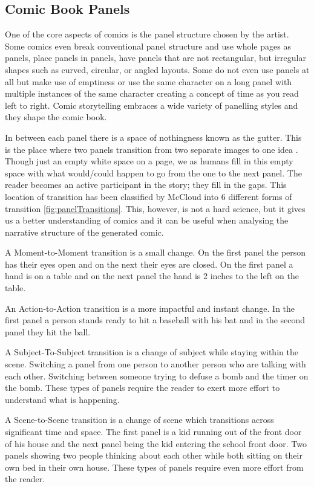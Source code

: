 \subsection*{Comic Book Panels}
One of the core aspects of comics is the panel structure chosen by the artist. Some comics even break conventional panel structure and use whole pages as panels, place panels in panels, have panels that are not rectangular, but irregular shapes such as curved, circular, or angled layouts. Some do not even use panels at all but make use of emptiness or use the same character on a long panel with multiple instances of the same character creating a concept of time as you read left to right. Comic storytelling embraces a wide variety of panelling styles and they shape the comic book.

In between each panel there is a space of nothingness known as the gutter. This is the place where two panels transition from two separate images to one idea \cite{mccloud1993understanding}. Though just an empty white space on a page, we as humans fill in this empty space with what would/could happen to go from the one to the next panel. The reader becomes an active participant in the story; they fill in the gaps. This location of transition has been classified by McCloud into 6 different forms of transition \ref{fig:panelTransitions}. This, however, is not a hard science, but it gives us a better understanding of comics and it can be useful when analysing the narrative structure of the generated comic.

A Moment-to-Moment transition is a small change. On the first panel the person has their eyes open and on the next their eyes are closed. On the first panel a hand is on a table and on the next panel the hand is 2 inches to the left on the table.

An Action-to-Action transition is a more impactful and instant change. In the first panel a person stands ready to hit a baseball with his bat and in the second panel they hit the ball.

A Subject-To-Subject transition is a change of subject while staying within the scene. Switching a panel from one person to another person who are talking with each other. Switching between someone trying to defuse a bomb and the timer on the bomb. These types of panels require the reader to exert more effort to understand what is happening.

A Scene-to-Scene transition is a change of scene which transitions across significant time and space. The first panel is a kid running out of the front door of his house and the next panel being the kid entering the school front door. Two panels showing two people thinking about each other while both sitting on their own bed in their own house. These types of panels require even more effort from the reader.

